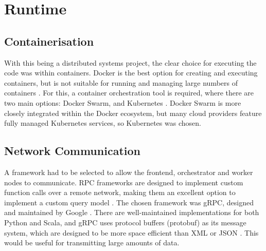 \section{Runtime}
\subsection{Containerisation}
With this being a distributed systems project, the clear choice for executing the code was within containers. Docker is the best option for creating and executing containers, but is not suitable for running and managing large numbers of containers \cite{orchestrationdockerdocs}. For this, a container orchestration tool is required, where there are two main options: Docker Swarm, and Kubernetes \cite{dockerswarm, k8sapi}. Docker Swarm is more closely integrated within the Docker ecosystem, but many cloud providers feature fully managed Kubernetes services, so Kubernetes was chosen.

\subsection{Network Communication} 
A framework had to be selected to allow the frontend, orchestrator and worker nodes to communicate. RPC frameworks are designed to implement custom function calls over a remote network, making them an excellent option to implement a custom query model \cite{srinivasan1995rpc}. The chosen framework was gRPC, designed and maintained by Google \cite{gRPCapi}. There are well-maintained implementations for both Python and Scala, and gRPC uses protocol buffers (protobuf) as its message system, which are designed to be more space efficient than XML or JSON \cite{scalapbdocs, protobufdocs}. This would be useful for transmitting large amounts of data. 


